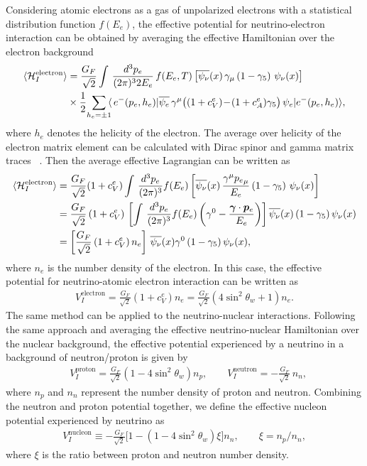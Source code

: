 Considering atomic electrons as a gas of unpolarized electrons with a statistical distribution function $f(E_e)$, the effective potential for neutrino-electron interaction can be obtained by averaging the effective Hamiltonian over the electron background~\cite{Giunti:2007ry}
\begin{align}
\langle{\mathcal{H}^\mathrm{electron}_{I}}\rangle&=\frac{G_F}{\sqrt{2}}\int\,\frac{d^3p_e}{(2\pi)^32E_e}\,f(E_e,T)\left[\overline{\psi_\nu}(x)\,\gamma_\mu\left(1-\gamma_5\right)\,\psi_\nu(x)\right]\notag\\&\times\frac{1}{2}\!\sum_{h_e=\pm1}\!\!\langle\,e^-(p_e,h_e)|\overline{\psi_e}\,\gamma^\mu\big((1+c^e_V)\!-\!(1+c^e_A)\gamma_5\big)\,\psi_e|e^-(p_e,h_e)\rangle,
\end{align}
where $h_e$ denotes the helicity of the electron. The average over helicity of the electron matrix element can be calculated with Dirac spinor and gamma matrix traces ~\cite{Giunti:2007ry}. Then the average effective Lagrangian can be written as
\begin{align}
\langle{\mathcal{H}^\mathrm{electron}_{I}}\rangle&=\frac{G_F}{\sqrt{2}}(1+c^e_V)\int\,\frac{d^3p_e}{(2\pi)^3}f(E_e)\left[\overline{\psi_\nu}(x)\,\frac{\gamma^\mu{p_e}_\mu}{E_e}\left(1-\gamma_5\right)\,\psi_\nu(x)\right]\notag\\
&=\frac{G_F}{\sqrt{2}}\,(1+c^e_V)\,\left[\int\,\frac{d^3p_e}{(2\pi)^3}f(E_e)\left(\gamma^0-\frac{\vec{\gamma}\cdot\vec{{p}}_e}{E_e}\right)\right]\overline{\psi_\nu}(x)\left(1-\gamma_5\right)\psi_\nu(x)\notag\\
&=\left[\frac{G_F}{\sqrt{2}}\left(1+c^e_V\right)n_{e}\right]\,\overline{\psi_\nu}(x)\gamma^0\left(1-\gamma_5\right)\psi_\nu(x),
\end{align}
where $n_e$ is the number density of the electron. In this case, the effective potential for neutrino-atomic electron interaction can be written as
\begin{align}
V^{\mathrm{electron}}_{I}=\frac{G_F}{\sqrt{2}}\left(1+c^e_V\right)n_{e}=\frac{G_F}{\sqrt{2}}\left(4\sin^2\theta_w+1\right)n_{e}.
\end{align}
The same method can be applied to the neutrino-nuclear interactions. Following the same approach and averaging the effective neutrino-nuclear Hamiltonian over the nuclear background, the effective potential experienced by a neutrino in a background of neutron/proton is given by~\cite{Giunti:2007ry} 
\begin{align}
&V_{I}^{\mathrm{proton}}=\frac{G_F}{\sqrt{2}}\left(1-4\sin^2\theta_w\right)n_{p},\qquad V_{I}^{\mathrm{neutron}}=-\frac{G_F}{\sqrt{2}}\,n_{n},
\end{align}
where $n_p$ and $n_n$ represent the number density of proton and neutron.
Combining the neutron and proton potential together, we define the effective nucleon potential experienced by neutrino as 
\begin{align}
V_I^{\mathrm{nucleon}}\equiv-\frac{G_F}{\sqrt{2}}\bigg[1-\left(1-4\sin^2\theta_w\right)\xi\bigg]n_{n},\qquad\xi=n_{p}/n_{n},
\end{align}
where $\xi$ is the ratio between proton and neutron number density.

